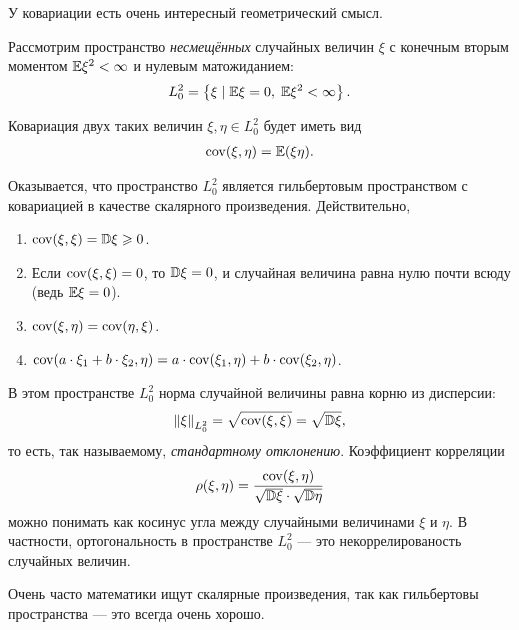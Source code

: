 \documentclass[../main.tex]{subfiles}
\begin{document}
\begin{remrk}
 \label{remark:cov_geometric_intuition}
 У ковариации есть очень интересный геометрический смысл. 

 Рассмотрим пространство \textit{несмещённых} случайных величин $ \xi $ с конечным вторым моментом $ \mathbb E\xi^{2} < \infty $ и нулевым матожиданием:
 \begin{align*}
  L^{2}_0 = \left\{ \xi \mid \mathbb E\xi = 0,\; \mathbb E\xi^{2} < \infty \right\}.
 \end{align*}

 Ковариация двух таких величин $ \xi,\eta\in L^{2}_0 $ будет иметь вид
 \begin{align*}
  \mathrm{cov}(\xi,\eta) = \mathbb E(\xi\eta).
 \end{align*}

 Оказывается, что пространство $ L^{2}_0 $ является гильбертовым пространством с ковариацией в качестве скалярного произведения. Действительно,
 \begin{enumerate}
  \item $ \mathrm{cov}(\xi,\xi) = \mathbb D\xi \geqslant 0 $.
  \item Если $ \mathrm{cov}(\xi, \xi) = 0 $, то $ \mathbb D\xi = 0 $, и случайная величина равна нулю почти всюду (ведь $ \mathbb E\xi = 0$).
  \item $ \mathrm{cov}(\xi,\eta) = \mathrm{cov}(\eta,\xi) $.
  \item $ \mathrm{cov}(a \cdot \xi_1 + b \cdot \xi_2, \eta) = a \cdot \mathrm{cov}(\xi_1, \eta) + b \cdot \mathrm{cov}(\xi_2,\eta) $.
 \end{enumerate}

 В этом пространстве  $ L^{2}_0 $  норма случайной величины равна корню из дисперсии:
 \begin{align*}
  \left\| \xi \right\|_{L^{2}_0} = \sqrt{\mathrm{cov}(\xi,\xi)} = \sqrt{\mathbb D\xi},
 \end{align*} то есть, так называемому, \textit{стандартному отклонению}. Коэффициент корреляции
 \begin{align*}
  \rho(\xi,\eta) = \frac{\mathrm{cov}(\xi,\eta)}{\sqrt{\mathbb D\xi} \cdot \sqrt{\mathbb D\eta}}
 \end{align*} можно понимать как косинус угла между случайными величинами $ \xi $ и $ \eta $. В частности, ортогональность в пространстве $ L^{2}_0 $ --- это некоррелированость случайных величин.

 Очень часто математики ищут скалярные произведения, так как гильбертовы пространства --- это всегда очень хорошо.

\end{remrk}
\end{document}
